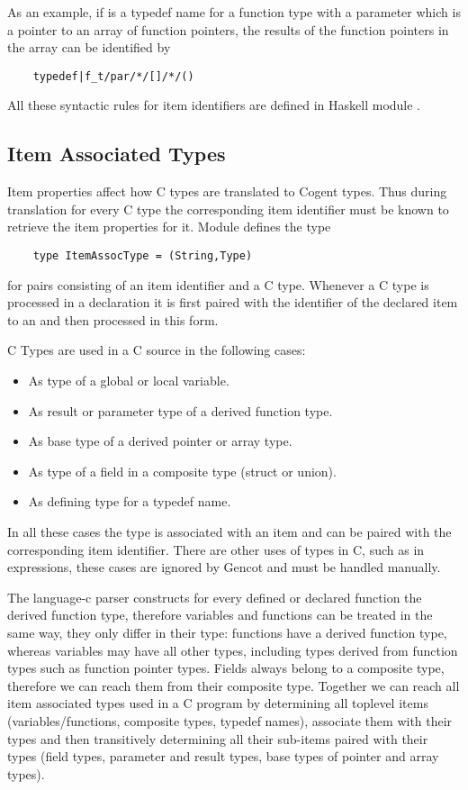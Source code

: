 As an example, if  is a typedef name for a function type with a parameter  
which is a pointer to an array of function pointers, the results of the function pointers in the
array can be identified by 
\begin{verbatim}
    typedef|f_t/par/*/[]/*/()
\end{verbatim}

All these syntactic rules for item identifiers are defined in Haskell module .

\subsection{Item Associated Types}
\label{impl-itemprops-types}

Item properties affect how C types are translated to Cogent types. Thus during translation for every C
type the corresponding item identifier must be known to retrieve the item properties for it. Module
 defines the type 
\begin{verbatim}
    type ItemAssocType = (String,Type)
\end{verbatim}
for pairs consisting of an item identifier and a C type. Whenever a C type is processed in a declaration
it is first paired with the identifier of the declared item to an  and then processed in
this form. 

C Types are used in a C source in the following cases:
\begin{itemize}
\item As type of a global or local variable.
\item As result or parameter type of a derived function type.
\item As base type of a derived pointer or array type.
\item As type of a field in a composite type (struct or union).
\item As defining type for a typedef name.
\end{itemize}
In all these cases the type is associated with an item and can be paired with the corresponding item identifier.
There are other uses of types in C, such as in  expressions, these cases are ignored by Gencot and 
must be handled manually.

The language-c
parser constructs for every defined or declared function the derived function type, therefore variables and functions
can be treated in the same way, they only differ in their type: functions have a derived function type, whereas
variables may have all other types, including types derived from function types such as function pointer types. Fields 
always belong to a composite type, therefore we can reach them from their composite type.
Together we can reach all item associated types used in a C program by determining all toplevel items (variables/functions, 
composite types, typedef names), associate them with their types and then transitively determining all their sub-items 
paired with their types (field types, parameter and result types, base types of pointer and array types). 


